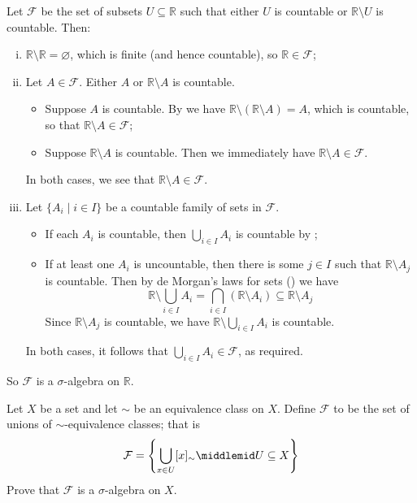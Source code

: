 \begin{example}
Let $\mathcal{F}$ be the set of subsets $U \subseteq \mathbb{R}$ such that either $U$ is countable or $\mathbb{R} \setminus U$ is countable. Then:

\begin{enumerate}[(i)]
\item $\mathbb{R} \setminus \mathbb{R} = \varnothing$, which is finite (and hence countable), so $\mathbb{R} \in \mathcal{F}$;

\item Let $A \in \mathcal{F}$. Either $A$ or $\mathbb{R} \setminus A$ is countable.
\begin{itemize}
\item Suppose $A$ is countable. By  we have $\mathbb{R} \setminus (\mathbb{R} \setminus A) = A$, which is countable, so that $\mathbb{R} \setminus A \in \mathcal{F}$;
\item Suppose $\mathbb{R} \setminus A$ is countable. Then we immediately have $\mathbb{R} \setminus A \in \mathcal{F}$. 
\end{itemize}
In both cases, we see that $\mathbb{R} \setminus A \in \mathcal{F}$.

\item Let $\{ A_i \mid i \in I \}$ be a countable family of sets in $\mathcal{F}$.
\begin{itemize}
\item If each $A_i$ is countable, then $\bigcup_{i \in I} A_i$ is countable by ;
\item If at least one $A_i$ is uncountable, then there is some $j \in I$ such that $\mathbb{R} \setminus A_j$ is countable. Then by de Morgan's laws for sets () we have
\[ \mathbb{R} \setminus \bigcup_{i \in I} A_i = \bigcap_{i \in I} (\mathbb{R} \setminus A_i) \subseteq \mathbb{R} \setminus A_j \]
Since $\mathbb{R} \setminus A_j$ is countable, we have $\mathbb{R} \setminus \bigcup_{i \in I} A_i$ is countable.
\end{itemize}
In both cases, it follows that $\bigcup_{i \in I} A_i \in \mathcal{F}$, as required.
\end{enumerate}

So $\mathcal{F}$ is a $\sigma$-algebra on $\mathbb{R}$.
\end{example}

\begin{exercise}
Let $X$ be a set and let $\sim$ be an equivalence class on $X$. Define $\mathcal{F}$ to be the set of unions of $\sim$-equivalence classes; that is
\[ \mathcal{F} = \left\{ \bigcup_{x \in U} [x]_{\sim} \middlemid U \subseteq X \right\} \]
Prove that $\mathcal{F}$ is a $\sigma$-algebra on $X$.
\end{exercise}

